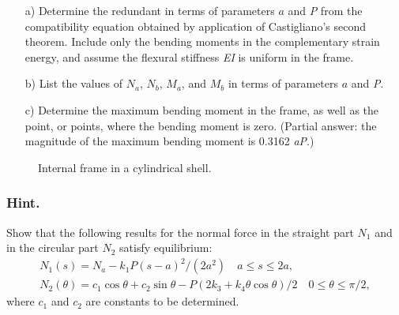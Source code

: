 \documentclass{AeroStructure-ERJohnson}
\begin{document}
\begin{exercise}
\begin{enumerate}[\textbf{2.}]
\begin{enumerate}[b)]
  \item[{\hskip13pt}a)] Determine the redundant in terms of parameters $a$ and \textit{P }from the compatibility equation obtained by application of Castigliano's second theorem. Include only the bending moments in the complementary strain energy, and assume the flexural stiffness \textit{EI} is uniform in the frame.
  \item[{\hskip13pt}b)] List the values of $N_{{a}}$, $N_{{b}}$, $M_{{a}}$, and $M_{{b}}$ in terms of parameters $a$ and \textit{P}.
  \item[{\hskip13pt}c)] Determine the maximum bending moment in the frame, as well as the point, or points, where the bending moment is zero. (Partial answer: the magnitude of the maximum bending moment is 0.3162 \textit{aP}.)
\end{enumerate}

{\def\thefigure{7.27}
\begin{figure}[h]
\caption{Internal frame in a cylindrical shell.\label{fig7.27}}
\end{figure}
}


\subsubsection{Hint.} Show that the following results for the normal force in the straight part $N_{1}$ and in the circular part $N_{2}$ satisfy equilibrium:
\begin{gather}
N_{1}(s)=N_{a}-k_{1} P(s-a)^{2} /(2 a^{2}) \quad a \leq s \leq 2 a, \label{eq7.49} \\
N_{2}(\theta)=c_{1} \cos \theta+c_{2} \sin \theta-P\left(2 k_{3}+k_{4} \theta \cos \theta\right) / 2 \quad 0 \leq \theta \leq \pi / 2, \label{eq7.50}
\end{gather}
where $c_1$ and $c_2$ are constants to be determined.
\end{enumerate}
\end{exercise}
\end{document}
